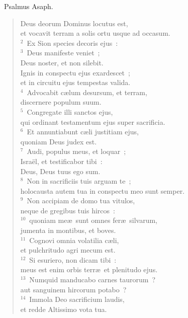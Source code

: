 ~\lettrine[lines=10,image=true,loversize=0.05,lraise=-0.03]{P}{}salmus Asaph. \begin{flushleft}\begin{verse}\vspace{6pt}Deus deorum Dominus locutus est,\\ et vocavit terram a solis ortu usque ad occasum.\\
${}^{2}$~Ex Sion species decoris ejus~:\\
${}^{3}$~Deus manifeste veniet~;\\ Deus noster, et non silebit.\\ Ignis in conspectu ejus exardescet~;\\ et in circuitu ejus tempestas valida.\\
${}^{4}$~Advocabit c\ae lum desursum, et terram,\\ discernere populum suum.\\
${}^{5}$~Congregate illi sanctos ejus,\\ qui ordinant testamentum ejus super sacrificia.\\
${}^{6}$~Et annuntiabunt c\ae li justitiam ejus,\\ quoniam Deus judex est.\\
${}^{7}$~Audi, populus meus, et loquar~;\\ Isra\"el, et testificabor tibi~:\\ Deus, Deus tuus ego sum.\\
${}^{8}$~Non in sacrificiis tuis arguam te~;\\ holocausta autem tua in conspectu meo sunt semper.\\
${}^{9}$~Non accipiam de domo tua vitulos,\\ neque de gregibus tuis hircos~:\\
${}^{10}$~quoniam me\ae\ sunt omnes fer\ae\ silvarum,\\ jumenta in montibus, et boves.\\
${}^{11}$~Cognovi omnia volatilia c\ae li,\\ et pulchritudo agri mecum est.\\
${}^{12}$~Si esuriero, non dicam tibi~:\\ meus est enim orbis terr\ae\ et plenitudo ejus.\\
${}^{13}$~Numquid manducabo carnes taurorum~?\\ aut sanguinem hircorum potabo~?\\
${}^{14}$~Immola Deo sacrificium laudis,\\ et redde Altissimo vota tua.\\

\end{verse}
\end{flushleft}
